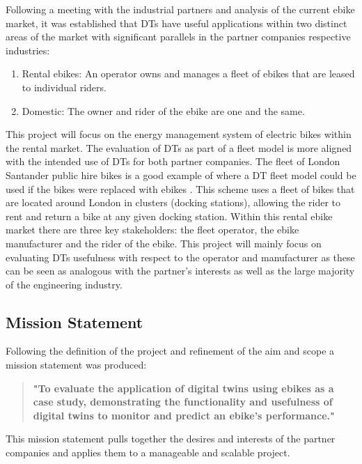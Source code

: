 \documentclass[a4paper, 10pt]{article}
\numberwithin{equation}{section}
\begin{document}
Following a meeting with the industrial partners and analysis of the current ebike market, it was established that DTs have useful applications within two distinct areas of the market with significant parallels in the partner companies respective industries: 

\begin{enumerate}
    \item Rental ebikes: An operator owns and manages a fleet of ebikes that are leased to individual riders.
    \item Domestic: The owner and rider of the ebike are one and the same.
\end{enumerate}

This project will focus on the energy management system of electric bikes within the rental market. The evaluation of DTs as part of a fleet model is more aligned with the intended use of DTs for both partner companies\cite{minutes:CDR}. The fleet of London Santander public hire bikes is a good example of where a DT fleet model could be used if the bikes were replaced with ebikes \cite{web:Santander_bikes}. This scheme uses a fleet of bikes that are located around London in clusters (docking stations), allowing the rider to rent and return a bike at any given docking station. Within this rental ebike market there are three key stakeholders: the fleet operator, the ebike manufacturer and the rider of the ebike. This project will mainly focus on evaluating DTs usefulness with respect to the operator and manufacturer as these can be seen as analogous with the partner's interests as well as the large majority of the engineering industry.


\subsection{Mission Statement}

Following the definition of the project and refinement of the aim and scope a mission statement was produced:
\begin{quote}
\begin{center}
   \textbf{"To evaluate the application of digital twins using ebikes as a case study, demonstrating the functionality and usefulness of digital twins to monitor and predict an ebike's performance."} 
\end{center}
\end{quote}

This mission statement pulls together the desires and interests of the partner companies and applies them to a manageable and scalable project.
\end{document}
